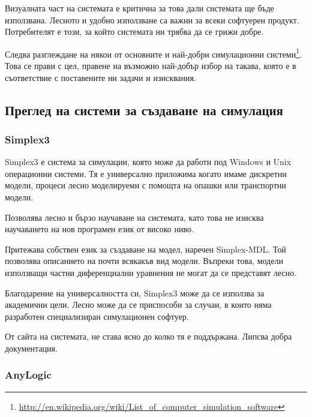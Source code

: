 		Визуалната част на системата е критична за това дали системата ще бъде използвана.
		Лесното и удобно използване са важни за всеки софтуерен продукт. 
		Потребителят е този, за който системата ни трябва да се грижи добре. \cite{Microsoft}
		
		Следва разглеждане на някои от основните и най-добри симулационни 
		системи\footnote{\url{http://en.wikipedia.org/wiki/List_of_computer_simulation_software}}.
		Това се прави с цел, правене на възможно най-добър избор на такава, която е в съответствие
		с поставените ни задачи и изисквания. 
	
	\subsection{Преглед на системи за създаване на симулация}
	
		\subsubsection{Simplex3}
		
			Simplex3 е система за симулации, която може да работи под Windows и Unix операционни системи.
			Тя е универсално приложима когато имаме дискретни модели, процеси 
			лесно моделируеми с помощта на опашки или транспортни модели.
			
 
				Позволява лесно и бързо научаване на системата, като това не изисква
				научаването на нов програмен език от високо ниво.			

				
				Притежава собствен език за създаване на модел, наречен Simplex-MDL. 
				Той позволява описанието на почти всякакъв вид модели. Въпреки това,
				модели използващи частни диференциални уравнения не могат да се представят
				лесно.
			
			
				Благодарение на универсалността си, Simplex3 може да се използва за академични цели.
				Лесно може да се приспособи за случаи, в които няма разработен специализиран симулационен
				софтуер. 
			
			
				От сайта на системата, не става ясно до колко тя е поддържана. 
				Липсва добра документация.\cite{Simplex3}
		
		\subsubsection{AnyLogic}
		

